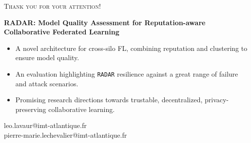 \begin{frame}
  \centering\scshape\large Thank you for your attention!

  \vfill
  
  \normalshape\normalsize

  \textbf{RADAR: Model Quality Assessment for Reputation-aware\\ Collaborative Federated Learning}
  \medskip
  
  \raggedright
  \begin{itemize}
    \item A novel architecture for cross-silo FL, combining reputation and clustering to ensure model quality.
    \item An evaluation highlighting \texttt{RADAR} resilience against a great range of failure and attack scenarios.
    \item Promising research directions towards trustable, decentralized, privacy-preserving collaborative learning.
  \end{itemize}

  \vfill

  \centering\small
  leo.lavaur@imt-atlantique.fr\\
  pierre-marie.lechevalier@imt-atlantique.fr

\end{frame}


